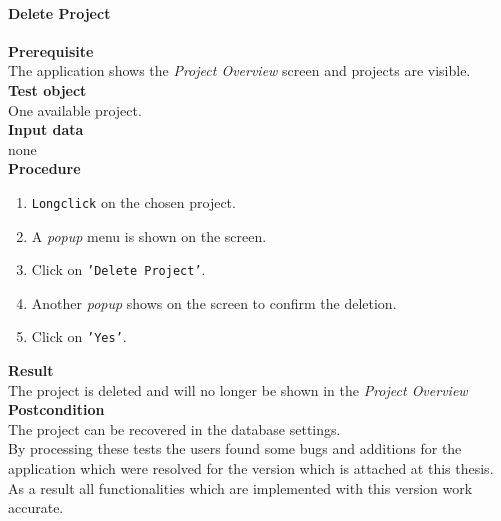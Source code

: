 \paragraph*{\textbf{Delete Project}}
\textbf{Prerequisite}\\
The application shows the \textit{Project Overview} screen and projects are visible.\\
\textbf{Test object}\\
One available project.\\
\textbf{Input data}\\
none\\
\textbf{Procedure}
\begin{enumerate}
	\item \texttt{Longclick} on the chosen project.
	\item A \textit{popup} menu is shown on the screen.
	\item Click on \texttt{'Delete Project'}.
	\item Another \textit{popup} shows on the screen to confirm the deletion.
	\item Click on \texttt{'Yes'}.
\end{enumerate}
\textbf{Result}\\
The project is deleted and will no longer be shown in the \textit{Project Overview}\\
\textbf{Postcondition}\\
The project can be recovered in the database settings.\\
By processing these tests the users found some bugs and additions for the application which were resolved for the version which is attached at this thesis. As a result all functionalities which are implemented with this version work accurate.